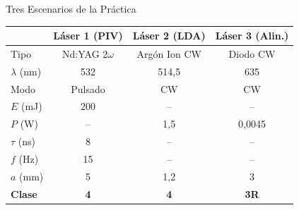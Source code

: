 \documentclass[aspectratio=169,12pt]{beamer}
\begin{document}
\begin{frame}{Tres Escenarios de la Práctica}
	\centering
	\small
	\begin{tabular}{lccc}
		\toprule
		               & \textbf{Láser 1 (PIV)} & \textbf{Láser 2 (LDA)} & \textbf{Láser 3 (Alin.)} \\
		\midrule
		Tipo           & Nd:YAG $2\omega$       & Argón Ion CW           & Diodo CW                 \\
		$\lambda$ (nm) & 532                    & 514,5                  & 635                      \\
		Modo           & Pulsado                & CW                     & CW                       \\
		$E$ (mJ)       & 200                    & {--}                   & {--}                     \\
		$P$ (W)        & {--}                   & 1,5                    & 0,0045                   \\
		$\tau$ (ns)    & 8                      & {--}                   & {--}                     \\
		$f$ (Hz)       & 15                     & {--}                   & {--}                     \\
		$a$ (mm)       & 5                      & 1,2                    & 3                        \\
		\rowcolor{aerored!15}
		\textbf{Clase} & \textbf{4}             & \textbf{4}             & \textbf{3R}              \\
		\bottomrule
	\end{tabular}
\end{frame}
\end{document}
